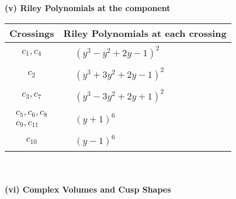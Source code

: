 \documentclass[1p]{elsarticle_modified}
\theoremstyle{definition}
\begin{document}
\newpage\renewcommand{\arraystretch}{1}
\flushleft \textbf{(v) Riley Polynomials at the component}\newline \\
\begin{tabular}{m{50pt}|m{274pt}}
Crossings & \hspace{64pt}Riley Polynomials at each crossing \\
\hline $$\begin{aligned}c_{1},c_{4}\end{aligned}$$&$\begin{aligned}
&(y^3- y^2+2 y-1)^2
\end{aligned}$\\
\hline $$\begin{aligned}c_{2}\end{aligned}$$&$\begin{aligned}
&(y^3+3 y^2+2 y-1)^2
\end{aligned}$\\
\hline $$\begin{aligned}c_{3},c_{7}\end{aligned}$$&$\begin{aligned}
&(y^3-3 y^2+2 y+1)^2
\end{aligned}$\\
\hline $$\begin{aligned}c_{5},c_{6},c_{8}\\c_{9},c_{11}\end{aligned}$$&$\begin{aligned}
&(y+1)^6
\end{aligned}$\\
\hline $$\begin{aligned}c_{10}\end{aligned}$$&$\begin{aligned}
&(y-1)^6
\end{aligned}$\\
\hline
\end{tabular}\\~\\
\newpage\flushleft \textbf{(vi) Complex Volumes and Cusp Shapes}
\end{document}
